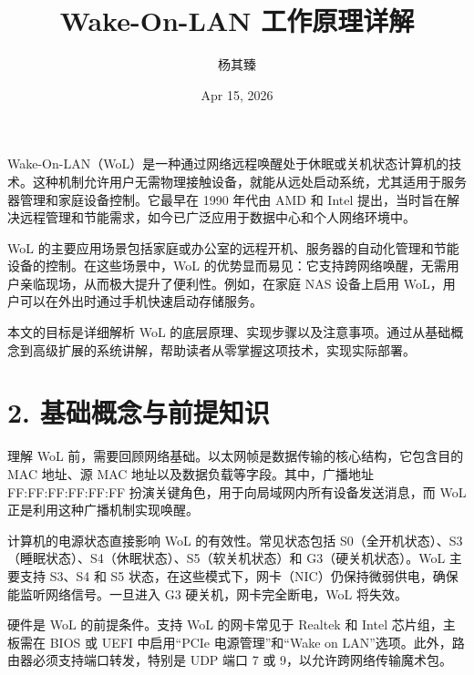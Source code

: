 \title{Wake-On-LAN 工作原理详解}
\author{杨其臻}
\date{Apr 15, 2026}
\maketitle
Wake-On-LAN（WoL）是一种通过网络远程唤醒处于休眠或关机状态计算机的技术。这种机制允许用户无需物理接触设备，就能从远处启动系统，尤其适用于服务器管理和家庭设备控制。它最早在 1990 年代由 AMD 和 Intel 提出，当时旨在解决远程管理和节能需求，如今已广泛应用于数据中心和个人网络环境中。\par
WoL 的主要应用场景包括家庭或办公室的远程开机、服务器的自动化管理和节能设备的控制。在这些场景中，WoL 的优势显而易见：它支持跨网络唤醒，无需用户亲临现场，从而极大提升了便利性。例如，在家庭 NAS 设备上启用 WoL，用户可以在外出时通过手机快速启动存储服务。\par
本文的目标是详细解析 WoL 的底层原理、实现步骤以及注意事项。通过从基础概念到高级扩展的系统讲解，帮助读者从零掌握这项技术，实现实际部署。\par
\chapter{2. 基础概念与前提知识}
理解 WoL 前，需要回顾网络基础。以太网帧是数据传输的核心结构，它包含目的 MAC 地址、源 MAC 地址以及数据负载等字段。其中，广播地址 FF:FF:FF:FF:FF:FF 扮演关键角色，用于向局域网内所有设备发送消息，而 WoL 正是利用这种广播机制实现唤醒。\par
计算机的电源状态直接影响 WoL 的有效性。常见状态包括 S0（全开机状态）、S3（睡眠状态）、S4（休眠状态）、S5（软关机状态）和 G3（硬关机状态）。WoL 主要支持 S3、S4 和 S5 状态，在这些模式下，网卡（NIC）仍保持微弱供电，确保能监听网络信号。一旦进入 G3 硬关机，网卡完全断电，WoL 将失效。\par
硬件是 WoL 的前提条件。支持 WoL 的网卡常见于 Realtek 和 Intel 芯片组，主板需在 BIOS 或 UEFI 中启用“PCIe 电源管理”和“Wake on LAN”选项。此外，路由器必须支持端口转发，特别是 UDP 端口 7 或 9，以允许跨网络传输魔术包。\par
